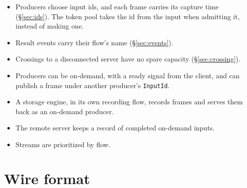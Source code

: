 \documentclass[11pt]{article}
\newcommand{\code}[1]{\texttt{#1}}
\begin{document}
\begin{itemize}[nosep]
  \item Producers choose input ids, and each frame carries its capture time
        (\S\ref{sec:ids}). The token pool takes the id from the input when admitting it,
        instead of making one.
  \item Result events carry their flow's name (\S\ref{sec:events}).
  \item Crossings to a disconnected server have no spare capacity
        (\S\ref{sec:crossing}).
  \item Producers can be on-demand, with a ready signal from the client, and
        can publish a frame under another producer's \code{InputId}.
  \item A storage engine, in its own recording flow, records frames and
        serves them back as an on-demand producer.
  \item The remote server keeps a record of completed on-demand inputs.
  \item Streams are prioritized by flow.
\end{itemize}

\section{Wire format}
\label{sec:wire}
\end{document}
